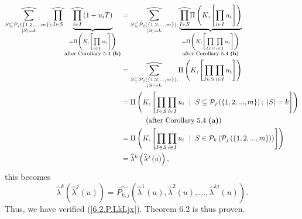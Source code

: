 \documentclass[numbers=enddot,12pt,final,onecolumn,notitlepage]{scrartcl}%
\begin{document}
\begin{align*}
\widehat{\sum_{\substack{S\subseteq\mathcal{P}_{j}\left(  \left\{
1,2,...,m\right\}  \right)  ;\\\left\vert S\right\vert =k}}}\widehat{\prod
_{I\in S}}\underbrace{\widehat{\prod_{i\in I}}\left(  1+u_{i}T\right)
}_{\substack{=\Pi\left(  K,\left[  \prod\limits_{i\in I}u_{i}\right]  \right)
\\\text{after Corollary 5.4 \textbf{(b)}}}}  &  =\widehat{\sum
_{\substack{S\subseteq\mathcal{P}_{j}\left(  \left\{  1,2,...,m\right\}
\right)  ;\\\left\vert S\right\vert =k}}}\underbrace{\widehat{\prod_{I\in S}%
}\Pi\left(  K,\left[  \prod\limits_{i\in I}u_{i}\right]  \right)
}_{\substack{=\Pi\left(  K,\left[  \prod\limits_{I\in S}\prod\limits_{i\in
I}u_{i}\right]  \right)  \\\text{after Corollary 5.4 \textbf{(b)}}}}\\
&  =\widehat{\sum_{\substack{S\subseteq\mathcal{P}_{j}\left(  \left\{
1,2,...,m\right\}  \right)  ;\\\left\vert S\right\vert =k}}}\Pi\left(
K,\left[  \prod\limits_{I\in S}\prod\limits_{i\in I}u_{i}\right]  \right) \\
&  =\Pi\left(  K,\left[  \prod\limits_{I\in S}\prod\limits_{i\in I}u_{i}%
\ \mid\ S\subseteq\mathcal{P}_{j}\left(  \left\{  1,2,...,m\right\}  \right)
;\ \left\vert S\right\vert =k\right]  \right) \\
&  \ \ \ \ \ \ \ \ \ \ \left(  \text{after Corollary 5.4 \textbf{(a)}}\right)
\\
&  =\Pi\left(  K,\left[  \prod_{I\in S}\prod\limits_{i\in I}u_{i}\ \mid
\ S\in\mathcal{P}_{k}\left(  \mathcal{P}_{j}\left(  \left\{
1,2,...,m\right\}  \right)  \right)  \right]  \right) \\
&  =\widehat{\lambda}^{k}\left(  \widehat{\lambda}^{j}\left(  u\right)
\right)  ,
\end{align*}
this becomes%
\[
\widehat{\lambda}^{k}\left(  \widehat{\lambda}^{j}\left(  u\right)  \right)
=\widehat{P_{k,j}}\left(  \widehat{\lambda}^{1}\left(  u\right)
,\widehat{\lambda}^{2}\left(  u\right)  ,...,\widehat{\lambda}^{kj}\left(
u\right)  \right)  .
\]
Thus, we have verified (\ref{6.2.P.LkLjx}). Theorem 6.2 is thus proven.
\end{document}
